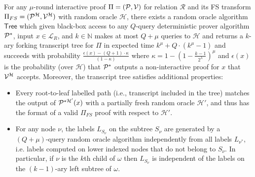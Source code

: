 \begin{lemma}[FS for special-sound multiround protocols~\cite{EPRINT:AttFehKlo21,EPRINT:Wikstrom21] \label{lem:FSSoundness}
	For any $\mu$-round interactive proof $\Pi = (\mathcal{P}, \mathcal{V})$ for relation $\mathcal{R}$ and its FS transform $\Pi_{FS} = (\mathcal{P}^\mathcal{H}, \mathcal{V}^\mathcal{H})$ with random oracle $\mathcal{H}$, there exists a random oracle algorithm $\textsf{Tree}$ which given black-box access to any $Q$-query deterministic prover algorithm $\mathcal{P}^*$, input $x \in \mathcal{L}_R$, and $k \in \mathbb{N}$ makes at most $Q+\mu$ queries to $\mathcal{H}$ and returns a $k$-ary forking transcript tree for $\Pi$ in expected time $k^\mu + Q \cdot (k^\mu - 1)$ and succeeds with probability $\frac{\epsilon(x) - (Q+1) \cdot \kappa }{(1 - \kappa)}$ where $\kappa = 1 - (1 - \frac{k-1}{2^\lambda})^\mu$ and $\epsilon(x)$ is the probability (over $\mathcal{H}$) that $\mathcal{P}^*$ outputs a non-interactive proof for $x$ that $\mathcal{V}^\mathcal{H}$ accepts. Moreover, the transcript tree satisfies additional properties: 
	\begin{itemize}
	\item Every root-to-leaf labelled path (i.e., transcript included in the tree) matches the output of $\mathcal{P}^{*\mathcal{H}'}(x)$ with a partially fresh random oracle $\mathcal{H}'$, and thus has the format of a valid $\Pi_{FS}$ proof with respect to $\mathcal{H}'$.  
	\item For any node $\nu$, the labels $L_{S_\nu}$ on the subtree $S_\nu$ are generated by a $(Q+\mu)$-query random oracle algorithm independently from all labels $L_{\nu^*}$, i.e. labels computed on lower indexed nodes that do not belong to $S_\nu$. In particular, if $\nu$ is the $k$th child of $\omega$ then $L_{S_\nu}$ is independent of the labels on the $(k-1)$-ary left subtree of $\omega$.  
	\end{itemize}

	
\end{lemma}

